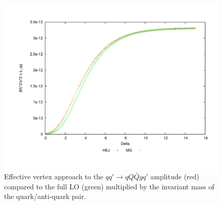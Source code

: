 \begin{figure}[H]
\centering
\includegraphics[scale=0.44]{Images/qQ_qqqxgQ_sqq.pdf}
\caption{Effective vertex approach to the $qq' \to qQ\bar{Q}gq'$ amplitude (red) compared to the full LO (green) multiplied by the invariant mass of the quark/anti-quark pair.}
\label{fig:central_gback}
\end{figure}

